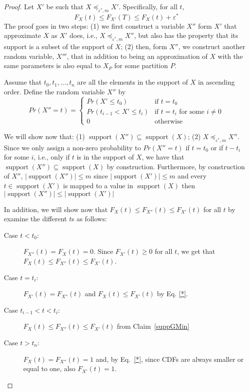 \documentclass[review]{elsarticle}
\DeclareMathOperator{\support}{support}
\begin{document}
\begin{proof}
Let $X'$ be such that $X \preceq_{\varepsilon^*,m} X'$. Specifically, for all $t$,
\begin{equation}
F_{X}(t) \leq F_{X'}(T) \leq F_X(t)+\varepsilon^*
\label{*}
\end{equation}
The proof goes in two steps: (1) we first construct a variable $X''$ form $X'$ that approximate $X$ as $X'$ does, i.e., $X \preceq_{\varepsilon^*,m} X''$, but also has the property that its support is a subset of the support of $X$; (2) then, form $X''$, we construct another random variable, $X'''$, that in addition to being an approximation of $X$ with the same parameters is also equal to $X_P$ for some partition $P$. 


Assume that $t_0,t_1,\dots,t_n$ are all the elements in the support of $X$ in ascending order. Define the random variable $X''$ by 
$$
Pr(X''=t) = \begin{cases}
Pr(X' \leq t_0)           & \text{if } t=t_0  \\ 
Pr(t_{i-1} < X' \leq t_i) & \text{if } t=t_i \text{ for some } i \neq 0 \\ 
0                         & \text{otherwise}
\end{cases}
$$

We will show now that: (1) $\support(X'') \subseteq \support(X)$; (2) $X \preceq_{\varepsilon^*,m} X''$.
Since we only assign a non-zero probability to $Pr(X''=t)$ if $t=t_0$ or if $t-t_i$ for some $i$, i.e., only if $t$ is in the support of $X$, we have that $\support(X'') \subseteq \support(X)$ by construction. Furthermore, by construction of $X''$, $|\support(X'')|\leq m$ since $|\support(X')|\leq m$ and every $ t\in \support(X')$ is mapped to a 
value in $\support(X)$ then $|\support(X'')|\leq |\support(X')|$

In addition, we will show now that $F_{X}(t) \leq  F_{X''}(t) \leq F_{X'}(t)$ for all $t$ by examine the different $t$s as follows: 
\begin{description}
\item[Case $t < t_0$:] $F_{X''}(t)=F_{X}(t)=0$. Since $F_{X'}(t) \geq 0$ for all $t$, we get that $F_{X}(t) \leq  F_{X''}(t) \leq F_{X'}(t)$.
\item[Case $t=t_i$:] $F_{X'}(t)=F_{X''}(t)$ and $F_{X}(t) \leq F_{X'}(t)$ by Eq. \eqref{*}.
\item[Case $t_{i-1} < t < t_i$:]
$F_{X}(t) \leq F_{X''}(t) \leq F_{X'}(t)$ from Claim~\ref{suppGMin}
\item[Case $t > t_n$:] $F_{X}(t)= F_{X''}(t)=1$ and, by Eq.~\eqref{*}, since CDFs are always smaller or equal to one, also $F_{X'}(t)=1$.


\end{description}
\end{proof}
\end{document}
